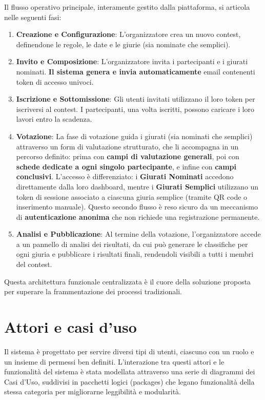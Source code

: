 Il flusso operativo principale, interamente gestito dalla piattaforma, si articola nelle seguenti fasi:
\begin{enumerate}
    \item \textbf{Creazione e Configurazione}: L'organizzatore crea un nuovo contest, definendone le regole, le date e le giurie (sia nominate che semplici).
    \item \textbf{Invito e Composizione}: L'organizzatore invita i partecipanti e i giurati nominati. \textbf{Il sistema genera e invia automaticamente} email contenenti token di accesso univoci.
    \item \textbf{Iscrizione e Sottomissione}: Gli utenti invitati utilizzano il loro token per iscriversi al contest.
    I partecipanti, una volta iscritti, possono caricare i loro lavori entro la scadenza.
    \item \textbf{Votazione}: La fase di votazione guida i giurati (sia nominati che semplici) attraverso un form di valutazione strutturato, che li accompagna in un percorso definito: prima con \textbf{campi di valutazione generali}, poi con \textbf{schede dedicate a ogni singolo partecipante}, e infine con \textbf{campi conclusivi}.
    L'accesso è differenziato: i \textbf{Giurati Nominati} accedono direttamente dalla loro dashboard, mentre i \textbf{Giurati Semplici} utilizzano un token di sessione associato a ciascuna giuria semplice (tramite QR code o inserimento manuale).
    Questo secondo flusso è reso sicuro da un meccanismo di \textbf{autenticazione anonima} che non richiede una registrazione permanente.
    \item \textbf{Analisi e Pubblicazione}: Al termine della votazione, l'organizzatore accede a un pannello di analisi dei risultati, da cui può generare le classifiche per ogni giuria e pubblicare i risultati finali, rendendoli visibili a tutti i membri del contest.
\end{enumerate}

Questa architettura funzionale centralizzata è il cuore della soluzione proposta per superare la frammentazione dei processi tradizionali.

\section{Attori e casi d’uso}\label{sec:attori-e-casi-duso}
Il sistema è progettato per servire diversi tipi di utenti, ciascuno con un ruolo e un insieme di permessi ben definiti.
L'interazione tra questi attori e le funzionalità del sistema è stata modellata attraverso una serie di diagrammi dei Casi d'Uso, suddivisi in pacchetti logici (packages) che legano funzionalità della stessa categoria per migliorarne leggibilità e modularità.

